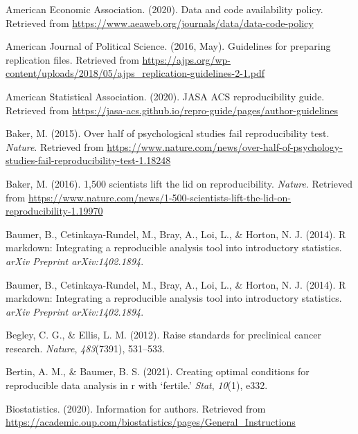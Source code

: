 \documentclass[12pt,twoside]{reedthesis}
\newenvironment{CSLReferences}%
  {}%
  {\par}
\begin{document}
\hypertarget{refs}{}
\begin{CSLReferences}{1}{0}
\leavevmode\hypertarget{ref-aee-policy}{}%
American Economic Association. (2020). Data and code availability policy. Retrieved from \url{https://www.aeaweb.org/journals/data/data-code-policy}

\leavevmode\hypertarget{ref-ajps-guidelines}{}%
American Journal of Political Science. (2016, May). Guidelines for preparing replication files. Retrieved from \url{https://ajps.org/wp-content/uploads/2018/05/ajps_replication-guidelines-2-1.pdf}

\leavevmode\hypertarget{ref-asa-guide}{}%
American Statistical Association. (2020). JASA ACS reproducibility guide. Retrieved from \url{https://jasa-acs.github.io/repro-guide/pages/author-guidelines}

\leavevmode\hypertarget{ref-nature-psych}{}%
Baker, M. (2015). Over half of psychological studies fail reproducibility test. \emph{Nature}. Retrieved from \url{https://www.nature.com/news/over-half-of-psychology-studies-fail-reproducibility-test-1.18248}

\leavevmode\hypertarget{ref-nature-crisis}{}%
Baker, M. (2016). 1,500 scientists lift the lid on reproducibility. \emph{Nature}. Retrieved from \url{https://www.nature.com/news/1-500-scientists-lift-the-lid-on-reproducibility-1.19970}

\leavevmode\hypertarget{ref-baumer2014r}{}%
Baumer, B., Cetinkaya-Rundel, M., Bray, A., Loi, L., \& Horton, N. J. (2014). R markdown: Integrating a reproducible analysis tool into introductory statistics. \emph{arXiv Preprint arXiv:1402.1894}.

\leavevmode\hypertarget{ref-baumer2014r}{}%
Baumer, B., Cetinkaya-Rundel, M., Bray, A., Loi, L., \& Horton, N. J. (2014). R markdown: Integrating a reproducible analysis tool into introductory statistics. \emph{arXiv Preprint arXiv:1402.1894}.

\leavevmode\hypertarget{ref-begley2012raise}{}%
Begley, C. G., \& Ellis, L. M. (2012). Raise standards for preclinical cancer research. \emph{Nature}, \emph{483}(7391), 531--533.

\leavevmode\hypertarget{ref-bertin2021creating}{}%
Bertin, A. M., \& Baumer, B. S. (2021). Creating optimal conditions for reproducible data analysis in r with {`fertile.'} \emph{Stat}, \emph{10}(1), e332.

\leavevmode\hypertarget{ref-journal-biostats}{}%
Biostatistics. (2020). Information for authors. Retrieved from \url{https://academic.oup.com/biostatistics/pages/General_Instructions}


\end{CSLReferences}
\end{document}
